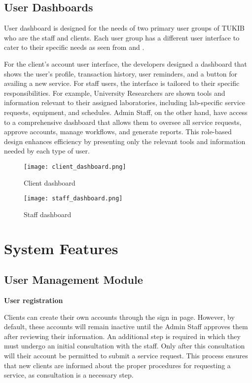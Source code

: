 \subsection{User Dashboards}

User dashboard is designed for the needs of two primary user groups of TUKIB who are the staff and clients. Each user group has a different user interface to cater to their specific needs as seen from  and .

For the client’s account user interface, the developers designed a dashboard that shows the user’s profile, transaction history, user reminders, and a button for availing a new service. For staff users, the interface is tailored to their specific responsibilities. For example, University Researchers are shown tools and information relevant to their assigned laboratories, including lab-specific service requests, equipment, and schedules. Admin Staff, on the other hand, have access to a comprehensive dashboard that allows them to oversee all service requests, approve accounts, manage workflows, and generate reports. This role-based design enhances efficiency by presenting only the relevant tools and information needed by each type of user.

\begin{figure}[h]
	\centering 
	\texttt{[image: client\_dashboard.png]}
	\caption{Client dashboard}
	\label{fig:client_dashboard}
\end{figure}

\begin{figure}[h]
	\centering 
	\texttt{[image: staff\_dashboard.png]}
	\caption{Staff dashboard}
	\label{fig:staff_dashboard}
\end{figure}

\newpage

\section{System Features}

\subsection{User Management Module}

\textbf{User registration}

Clients can create their own accounts through the sign in page. However, by default, these accounts will remain inactive until the Admin Staff approves them after reviewing their information. An additional step is required in which they must undergo an initial consultation with the staff. Only after this consultation will their account be permitted to submit a service request. This process ensures that new clients are informed about the proper procedures for requesting a service, as consultation is a necessary step.

